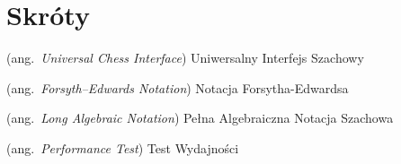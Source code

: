 %
\chapter*{Skróty}
\label{sec:skroty}
\noindent\vspace{-\topsep-\partopsep-\parsep} %
\begin{description}[labelwidth=*]
  \item [UCI] (ang.\ \emph{Universal Chess Interface}) Uniwersalny Interfejs Szachowy
  \item [FEN] (ang.\ \emph{Forsyth–Edwards Notation}) Notacja Forsytha-Edwardsa
  \item [LAN] (ang.\ \emph{Long Algebraic Notation}) Pełna Algebraiczna Notacja Szachowa
  \item [Perft] (ang.\ \emph{Performance Test}) Test Wydajności
\end{description}


